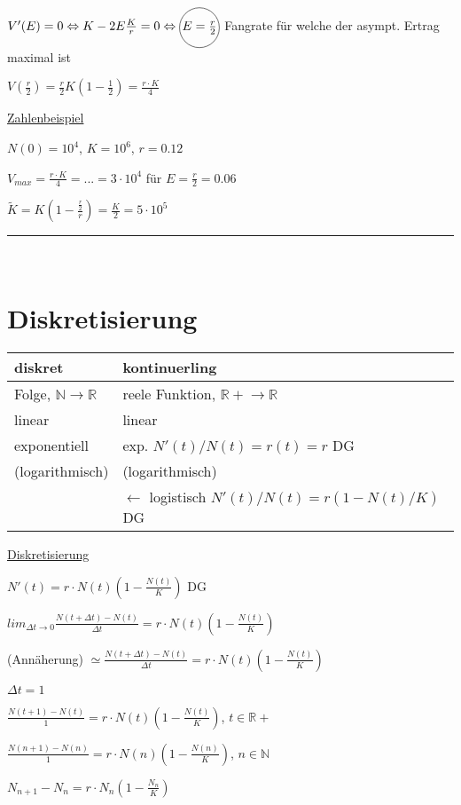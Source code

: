 \documentclass[18pt,a4paper]{scrreprt}
\newcommand*\circled[1]{\tikz[baseline=(char.base)]{
            \node[shape=circle,draw,inner sep=1pt] (char) {#1};}}
\begin{document}
$V'(E) = 0 \Leftrightarrow K - 2E \frac{K}{r} = 0 \Leftrightarrow \circled{$E = \frac{r}{2}$}$ Fangrate für welche der asympt. Ertrag maximal ist

$V(\frac{r}{2}) = \frac{r}{2} K (1- \frac{1}{2}) = \frac{r\cdot K}{4}$ 

\uline{Zahlenbeispiel}

$N(0) = 10^4$, $K = 10^6$, $r = 0.12$

$V_{max} = \frac{r\cdot K}{4} = ... = 3\cdot 10^4$ für $E = \frac{r}{2} = 0.06$

$\tilde{K} = K(1-\frac{\frac{r}{2}}{r}) = \frac{K}{2} = 5\cdot 10^5$

\rule{\textwidth}{0.4mm}\\

\section{Diskretisierung}

\begin{tabular}{| l | l |}
	\hline			
	\textbf{diskret} & \textbf{kontinuerling} \\ \hline \hline
	Folge, $\mathbb{N} \rightarrow \mathbb{R}$ & reele Funktion, $\mathbb{R+} \rightarrow \mathbb{R}$ \\ \hline
	linear & linear \\ \hline
	exponentiell & exp. $N'(t)/N(t) = r(t) = r$ \:\:\: DG \\ \hline
	(logarithmisch) & (logarithmisch) \\ \hline
	& $\leftarrow$ logistisch $N'(t)/N(t) = r(1-N(t)/K)$ \:\:\: DG \\ \hline
	\hline  
\end{tabular}

\vspace{1cm}
\uline{Diskretisierung}

$N'(t) = r\cdot N(t) (1-\frac{N(t)}{K})$ DG

$lim_{\Delta t \to 0}\frac{N(t+\Delta t) - N(t)}{\Delta t} = r\cdot N(t) (1-\frac{N(t)}{K})$

(Annäherung) $\simeq \frac{N(t+\Delta t) - N(t)}{\Delta t} = r\cdot N(t) (1-\frac{N(t)}{K})$

$\Delta t = 1$

$\frac{N(t+1) - N(t)}{1} = r\cdot N(t) (1-\frac{N(t)}{K})$, $t \in \mathbb{R+}$

$\frac{N(n+1) - N(n)}{1} = r\cdot N(n) (1-\frac{N(n)}{K})$, $n \in \mathbb{N}$

$N_{n+1} - N_n = r\cdot N_n (1-\frac{N_n}{K})$
\end{document}
